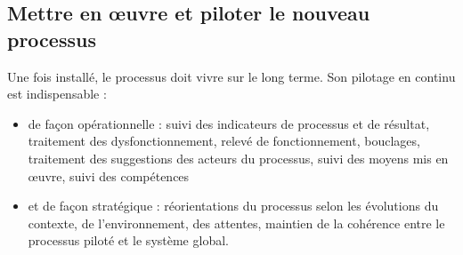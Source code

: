 \subsection{Mettre en œuvre et piloter le nouveau processus}

Une fois installé, le processus doit vivre sur le long terme. Son pilotage en continu est indispensable : 

\begin{itemize}[label=\textbullet, font=\LARGE \color{blue}]
	\item de façon opérationnelle : suivi des indicateurs de processus et de résultat, traitement des dysfonctionnement, relevé de fonctionnement, bouclages, traitement des suggestions des acteurs du processus, suivi des moyens mis en œuvre, suivi des compétences
	\item et de façon stratégique : réorientations du processus selon les évolutions du contexte, de l'environnement, des attentes, maintien de la cohérence entre le processus piloté et le système global. 
\end{itemize}